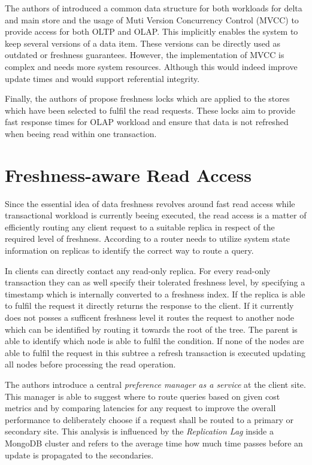 The authors of \cite{psaroudakis:2015} introduced a common data structure for both workloads for delta and
main store and the usage of Muti Version Concurrency Control (MVCC) to provide access for both OLTP and OLAP.
This implicitly enables the system to keep several versions of a data item.
These versions can be directly used as outdated or freshness guarantees. However, the implementation of MVCC is complex and needs more system resources.
Although this would indeed improve update times and would support referential integrity. 

Finally, the authors of \cite{akal:2005} propose freshness locks which are applied to the stores which have been selected to fulfil the read requests. 
These locks aim to provide fast response times for OLAP workload and ensure that data is not refreshed when beeing read within one transaction.


\section{Freshness-aware Read Access}
\label{r:read}
Since the essential idea of data freshness revolves around fast read access while transactional workload is currently beeing executed,
the read access is a matter of efficiently routing any client request to a suitable replica in respect of the required level of freshness.
According to \cite{rohm:2002} a router needs to utilize system state information on replicas to identify the correct way to route a query.

In \cite{voicu:2010} clients can directly contact any read-only replica. For every read-only transaction they can as well specify
their tolerated freshness level, by specifying a timestamp which is internally converted to a freshness index. If the replica is able to fulfil the request 
it directly returns the response to the client. If it currently does not posses a sufficent freshness level it routes the request to another node which can be identified 
by routing it towards the root of the tree. The parent is able to identify which node is able to fulfil the condition.  
If none of the nodes are able to fulfil the request in this subtree a refresh transaction is executed updating all nodes before processing the read operation.

The authors \cite{huang:2020} introduce a central \emph{preference manager as a service} at the client site. This manager is able to suggest where to route queries 
based on given cost metrics and by comparing latencies for any request to improve the overall performance to deliberately choose if a request shall be routed to a 
primary or secondary site. This analysis is influenced by the \emph{Replication Lag} inside a MongoDB cluster and refers to the average time how much time passes 
before an update is propagated to the secondaries. 





